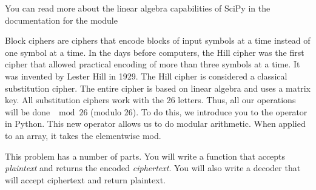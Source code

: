 You can read more about the linear algebra capabilities of SciPy in the documentation for the  module

\begin{problem}
Block ciphers are ciphers that encode blocks of input symbols at a time instead of one symbol at a time.
In the days before computers, the Hill cipher was the first cipher that allowed practical encoding of more than three symbols at a time.
It was invented by Lester Hill in 1929.
The Hill cipher is considered a classical substitution cipher.
The entire cipher is based on linear algebra and uses a matrix key.
All substitution ciphers work with the 26 letters.
Thus, all our operations will be done $\mod{26}$ (modulo 26).
To do this, we introduce you to the \li{\%} operator in Python.
This new operator allows us to do modular arithmetic.
When applied to an array, it takes the elementwise mod.

This problem has a number of parts.  You will write a function that accepts \emph{plaintext} and returns the encoded \emph{ciphertext}.
You will also write a decoder that will accept ciphertext and return plaintext.


\end{problem}
